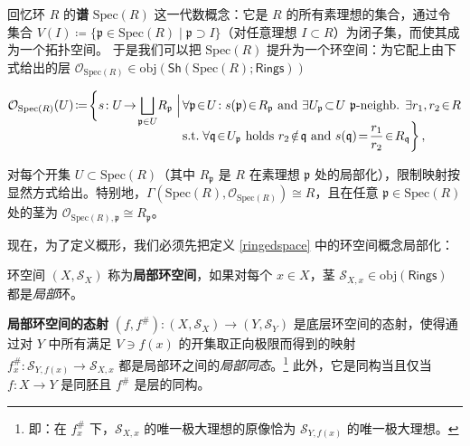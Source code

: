 \begin{Rem}\label{spectra}
回忆环 $R$ 的\textbf{谱} $\text{Spec}(R)$ 这一代数概念：它是 $R$ 的所有素理想的集合，通过令集合 $V(I)\coloneqq\{\mathfrak{p}\in\text{Spec}(R)\mid \mathfrak{p}\supset I\}$（对任意理想 $I\subset R$）为闭子集，而使其成为一个拓扑空间。
于是我们可以把 $\text{Spec}(R)$ 提升为一个环空间：为它配上由下式给出的层 $\mathcal{O}_{\text{Spec}(R)}\in\text{obj}(\mathsf{Sh}(\text{Spec}(R);\mathsf{Rings}))$
\begin{small}\begin{align*}
		\mathcal{O}_{\text{Spec}(R)}(U)\!\coloneqq\!\bigg\{s\!:U\!\rightarrow\!\bigsqcup_{\mathfrak{p}\in U}\! R_\mathfrak{p}\Bigm|\, &\forall\mathfrak{p}\!\in\! U\!: s(\mathfrak{p})\!\in\! R_\mathfrak{p}\text{ and }\exists U_\mathfrak{p}\!\subset\! U\text{ $\mathfrak{p}$-neighb. }\exists r_1,r_2\!\in\! R \\[-0.3cm]
		&\text{s.t. }\!\forall\mathfrak{q}\!\in\! U_\mathfrak{p}\text{ holds } r_2\!\notin\!\mathfrak{q} \text{ and }
		s(\mathfrak{q})\!=\! \frac{r_1}{r_2}\!\in\! R_\mathfrak{q}\bigg\}\,,
\end{align*}\end{small}
\!\!对每个开集 $U\subset \text{Spec}(R)$（其中 $R_\mathfrak{p}$ 是 $R$ 在素理想 $\mathfrak{p}$ 处的局部化），限制映射按显然方式给出。特别地，$\Gamma(\text{Spec}(R),\mathcal{O}_{\text{Spec}(R)})\cong R$，且在任意 $\mathfrak{p}\in \text{Spec}(R)$ 处的茎为 $\mathcal{O}_{\text{Spec}(R),\mathfrak{p}}\cong R_\mathfrak{p}$。
\end{Rem}

现在，为了定义概形，我们必须先把定义 \ref{ringedspace} 中的环空间概念局部化：

\begin{Def}\label{locallyringedspace}
环空间 $(X,\mathcal{S}_X)$ 称为\textbf{局部环空间}，如果对每个 $x\in X$，茎 $\mathcal{S}_{X,x}\in\text{obj}(\mathsf{Rings})$ 都是\textit{局部}环。

\textbf{局部环空间的态射} $(f,f^\#):(X,\mathcal{S}_X)\rightarrow (Y,\mathcal{S}_Y)$ 是底层环空间的态射，使得通过对 $Y$ 中所有满足 $V\ni f(x)$ 的开集取正向极限而得到的映射 $f^\#_x:\mathcal{S}_{Y,f(x)}\rightarrow \mathcal{S}_{X,x}$ 都是局部环之间的\textit{局部同态}。\footnote{即：在 $f^\#_x$ 下，$\mathcal{S}_{X,x}$ 的唯一极大理想的原像恰为 $\mathcal{S}_{Y,f(x)}$ 的唯一极大理想。} 此外，它是同构当且仅当 $f:X\rightarrow Y$ 是同胚且 $f^\#$ 是层的同构。 
\end{Def}

